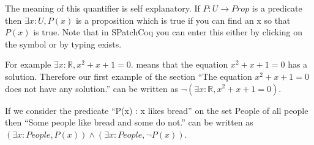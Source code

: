 The meaning of this quantifier is self explanatory. If $P:U \rightarrow Prop$ is a predicate then $\exists x:U, P(x)$ is a proposition which is true if you can find an x so that $P(x)$ is true. Note that in SPatchCoq you can enter this either by clicking on the symbol or by typing exists.


For example $\exists x:\mathbb{R}, x^{2}+x+1 =0.$ means that the equation $x^{2}+x+1=0$ has a solution. Therefore our first example of the section ``The equation $x^2+x+1=0$ does not have any solution.'' can be written as $\neg (\exists x:\mathbb{R}, x^{2}+x+1 =0).$ 

If we consider the predicate ``P(x) : x likes bread'' on the set People of all people then ``Some people like bread and some do not.'' can be written as $(\exists x:People, P(x))\land (\exists x:People, \neg P(x))$.